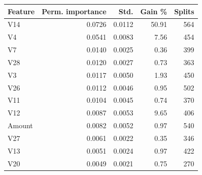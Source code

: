 \begin{tabular}{l r r r r}
\hline
\textbf{Feature} & \textbf{Perm. importance} & \textbf{Std.} & \textbf{Gain \%} & \textbf{Splits} \\
\hline
V14 & 0.0726 & 0.0112 & 50.91 & 564 \\
V4 & 0.0541 & 0.0083 & 7.56 & 454 \\
V7 & 0.0140 & 0.0025 & 0.36 & 399 \\
V28 & 0.0120 & 0.0027 & 0.73 & 363 \\
V3 & 0.0117 & 0.0050 & 1.93 & 450 \\
V26 & 0.0112 & 0.0046 & 0.95 & 502 \\
V11 & 0.0104 & 0.0045 & 0.74 & 370 \\
V12 & 0.0087 & 0.0053 & 9.65 & 406 \\
Amount & 0.0082 & 0.0052 & 0.97 & 540 \\
V27 & 0.0061 & 0.0022 & 0.35 & 346 \\
V13 & 0.0051 & 0.0024 & 0.97 & 422 \\
V20 & 0.0049 & 0.0021 & 0.75 & 270 \\
\hline
\end{tabular}